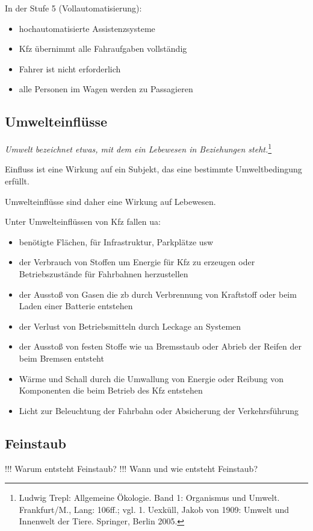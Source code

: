 In der Stufe 5 (Vollautomatisierung):
\begin{itemize}
	\item hochautomatisierte Assistenzsysteme
	\item \ac{Kfz} übernimmt alle Fahraufgaben vollständig
	\item Fahrer ist nicht erforderlich
	\item alle Personen im Wagen werden zu Passagieren
\end{itemize}

\subsection{Umwelteinflüsse}

\textit{Umwelt bezeichnet etwas, mit dem ein Lebewesen in Beziehungen steht.}\footnote{Ludwig Trepl: Allgemeine Ökologie. Band 1: Organismus und Umwelt. Frankfurt/M., Lang: 106ff.; vgl. 1. Uexküll, Jakob von 1909: Umwelt und Innenwelt der Tiere. Springer, Berlin 2005.}

Einfluss ist eine Wirkung auf ein Subjekt, das eine bestimmte Umweltbedingung erfüllt.

Umwelteinflüsse sind daher eine Wirkung auf Lebewesen.

\vspace{.5cm}
Unter Umwelteinflüssen von \ac{Kfz} fallen \ac{ua}:
\begin{itemize}
	\item benötigte Flächen, für Infrastruktur, Parkplätze \ac{usw}
	\item der Verbrauch von Stoffen um Energie für \ac{Kfz} zu erzeugen oder Betriebszustände für Fahrbahnen herzustellen
	\item der Ausstoß von Gasen die \ac{zb} durch Verbrennung von Kraftstoff oder beim Laden einer Batterie entstehen
	\item der Verlust von Betriebsmitteln durch Leckage an Systemen
	\item der Ausstoß von festen Stoffe wie \ac{ua} Bremsstaub oder Abrieb der Reifen der beim Bremsen entsteht
	\item Wärme und Schall durch die Umwallung von Energie oder Reibung von Komponenten die beim Betrieb des \ac{Kfz} entstehen
	\item Licht zur Beleuchtung der Fahrbahn oder Absicherung der Verkehrsführung
\end{itemize}


\subsection{Feinstaub}
!!! Warum entsteht Feinstaub?
!!! Wann und wie entsteht Feinstaub?


